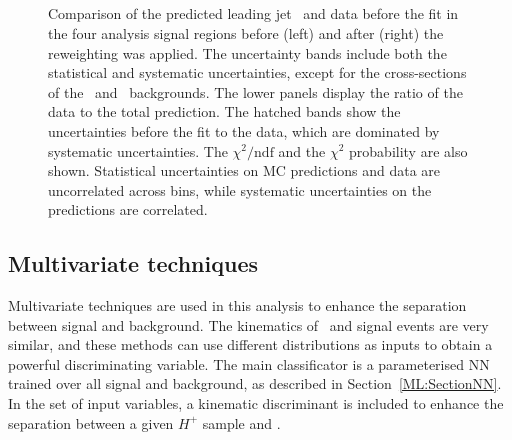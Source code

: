 \begin{figure}[htb]
    \RawFloats
    \begin{center}
     \\
       \\
      \\ 
      \\  
    \caption{Comparison of the predicted leading jet \pT\ and data before the fit in the four analysis signal regions before (left) and after (right) the reweighting was applied. The uncertainty bands include both the statistical and systematic uncertainties, except for the cross-sections of the \ttb\ and \ttc\ backgrounds.
    The lower panels display the ratio of the data to the total prediction. 
    The hatched bands show the uncertainties before the fit to the data,  which are dominated by systematic uncertainties. The $\chi^2/\mathrm{ndf}$ and the $\chi^2$ probability are also shown. Statistical uncertainties on MC predictions and data are uncorrelated across bins, while systematic uncertainties on the predictions are correlated.}
    \label{Hplustb:RWeffect}
\end{center}
\end{figure}
\clearpage
\subsection{Multivariate techniques}

Multivariate techniques are used in this analysis to enhance the separation between signal and background. The kinematics of \ttb\ and signal events are very similar, and these methods can use different distributions as inputs to obtain a powerful discriminating variable. The main classificator is a parameterised NN trained over all signal and background, as described in Section~\ref{ML:SectionNN}. In the set of input variables, a kinematic discriminant is included to enhance the separation between a given $H^+$ sample and \ttjets.


